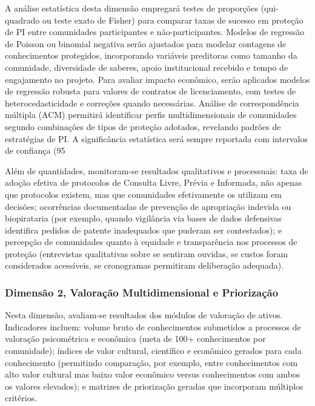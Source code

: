 A análise estatística desta dimensão empregará testes de proporções (qui-quadrado ou teste exato de Fisher) para comparar taxas de sucesso em proteção de PI entre comunidades participantes e não-participantes. Modelos de regressão de Poisson ou binomial negativa serão ajustados para modelar contagens de conhecimentos protegidos, incorporando variáveis preditoras como tamanho da comunidade, diversidade de saberes, apoio institucional recebido e tempo de engajamento no projeto. Para avaliar impacto econômico, serão aplicados modelos de regressão robusta para valores de contratos de licenciamento, com testes de heterocedasticidade e correções quando necessárias. Análise de correspondência múltipla (ACM) permitirá identificar perfis multidimensionais de comunidades segundo combinações de tipos de proteção adotados, revelando padrões de estratégias de PI. A significância estatística será sempre reportada com intervalos de confiança (95%

Além de quantidades, monitoram-se resultados qualitativos e processuais: taxa de adoção efetiva de protocolos de Consulta Livre, Prévia e Informada, não apenas que protocolos existem, mas que comunidades efetivamente os utilizam em decisões; ocorrências documentadas de prevenção de apropriação indevida ou biopirataria (por exemplo, quando vigilância via bases de dados defensivas identifica pedidos de patente inadequados que puderam ser contestados); e percepção de comunidades quanto à equidade e transparência nos processos de proteção (entrevistas qualitativas sobre se sentiram ouvidas, se custos foram considerados acessíveis, se cronogramas permitiram deliberação adequada).

\subsubsection{Dimensão 2, Valoração Multidimensional e Priori­zação}

Nesta dimensão, avaliam-se resultados dos módulos de valoração de ativos. Indicadores incluem: volume bruto de conhecimentos submetidos a processos de valoração psicométrica e econômica (meta de 100+ conhecimentos por comunidade); índices de valor cultural, científico e econômico gerados para cada conhecimento (permitindo comparação, por exemplo, entre conhecimentos com alto valor cultural mas baixo valor econômico versus conhecimentos com ambos os valores elevados); e matrizes de priorização geradas que incorporam múltiplos critérios.

